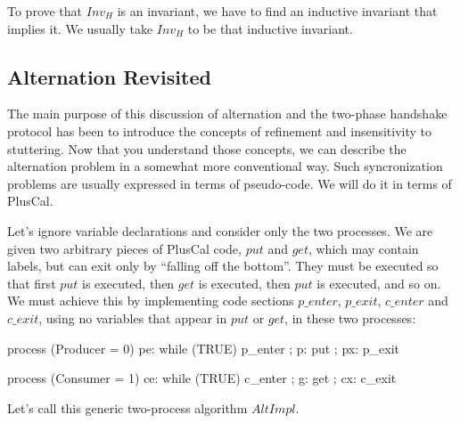 \documentclass[fleqn,leqno]{article}
\begin{document}
To prove that $Inv_{H}$ is an invariant, we have to find an inductive
invariant that implies it.  We usually take $Inv_{H}$ to be that
inductive invariant.

\subsection{Alternation Revisited}  

The main purpose of this discussion of alternation and the two-phase
handshake protocol has been to introduce the concepts of refinement
and insensitivity to stuttering.  Now that you understand those
concepts, we can describe the alternation problem in a somewhat more
conventional way.  Such syncronization problems are usually expressed
in terms of pseudo-code.  We will do it in terms of PlusCal.

Let's ignore variable declarations and consider only the two
processes.  We are given two arbitrary pieces of PlusCal code, $put$
and $get$, which may 
contain labels, but can exit only by ``falling
off the bottom''.  
They must be executed so that first $put$ is executed, then $get$ is
executed, then $put$ is executed, and so on.  We must achieve this by
implementing code sections $p\_enter$, $p\_exit$, $c\_enter$ and
$c\_exit$, using no variables that appear in $put$ or $get$, in these
two processes:
\begin{display}
\begin{twocols}[.4]
\begin{nopcal}
process (Producer = 0) 
  { pe: while (TRUE) 
          {      p_enter ;
            p:   put ;
            px:  p_exit     }
  }
\end{nopcal}      
\begin{tlatex}
%
%
%
%
\end{tlatex}
\midcol
\begin{nopcal}
process (Consumer = 1)
  { ce: while (TRUE)
          {      c_enter ;
            g:   get ; 
            cx:  c_exit        }
  }
\end{nopcal}
\begin{tlatex}
%
%
%
%
\end{tlatex}
\end{twocols}
\end{display}
Let's call this generic two-process algorithm $AltImpl$.
\end{document}
